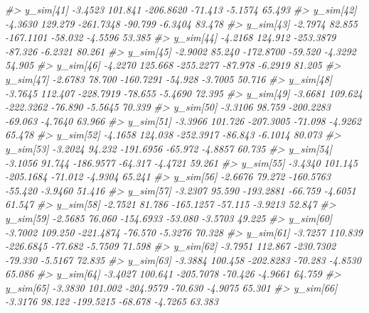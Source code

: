 \documentclass[
  10pt,
  italian,
  a4paper,
  extrafontsizes,onecolumn,openright
  ]{memoir}
\newenvironment{Shaded}{\begin{snugshade}}{\end{snugshade}}
\newcommand{\CommentTok}[1]{\textcolor[rgb]{0.56,0.35,0.01}{\textit{#1}}}
\begin{document}
\begin{Shaded}
\begin{Highlighting}[]
\CommentTok{\#\textgreater{}   y\_sim[41]  {-}3.4523 101.841 {-}206.8620 {-}71.413 {-}5.1574 65.493}
\CommentTok{\#\textgreater{}   y\_sim[42]  {-}4.3630 129.279 {-}261.7348 {-}90.799 {-}6.3404 83.478}
\CommentTok{\#\textgreater{}   y\_sim[43]  {-}2.7974  82.855 {-}167.1101 {-}58.032 {-}4.5596 53.385}
\CommentTok{\#\textgreater{}   y\_sim[44]  {-}4.2168 124.912 {-}253.3879 {-}87.326 {-}6.2321 80.261}
\CommentTok{\#\textgreater{}   y\_sim[45]  {-}2.9002  85.240 {-}172.8700 {-}59.520 {-}4.3292 54.905}
\CommentTok{\#\textgreater{}   y\_sim[46]  {-}4.2270 125.668 {-}255.2277 {-}87.978 {-}6.2919 81.205}
\CommentTok{\#\textgreater{}   y\_sim[47]  {-}2.6783  78.700 {-}160.7291 {-}54.928 {-}3.7005 50.716}
\CommentTok{\#\textgreater{}   y\_sim[48]  {-}3.7645 112.407 {-}228.7919 {-}78.655 {-}5.4690 72.395}
\CommentTok{\#\textgreater{}   y\_sim[49]  {-}3.6681 109.624 {-}222.3262 {-}76.890 {-}5.5645 70.339}
\CommentTok{\#\textgreater{}   y\_sim[50]  {-}3.3106  98.759 {-}200.2283 {-}69.063 {-}4.7640 63.966}
\CommentTok{\#\textgreater{}   y\_sim[51]  {-}3.3966 101.726 {-}207.3005 {-}71.098 {-}4.9262 65.478}
\CommentTok{\#\textgreater{}   y\_sim[52]  {-}4.1658 124.038 {-}252.3917 {-}86.843 {-}6.1014 80.073}
\CommentTok{\#\textgreater{}   y\_sim[53]  {-}3.2024  94.232 {-}191.6956 {-}65.972 {-}4.8857 60.735}
\CommentTok{\#\textgreater{}   y\_sim[54]  {-}3.1056  91.744 {-}186.9577 {-}64.317 {-}4.4721 59.261}
\CommentTok{\#\textgreater{}   y\_sim[55]  {-}3.4340 101.145 {-}205.1684 {-}71.012 {-}4.9304 65.241}
\CommentTok{\#\textgreater{}   y\_sim[56]  {-}2.6676  79.272 {-}160.5763 {-}55.420 {-}3.9460 51.416}
\CommentTok{\#\textgreater{}   y\_sim[57]  {-}3.2307  95.590 {-}193.2881 {-}66.759 {-}4.6051 61.547}
\CommentTok{\#\textgreater{}   y\_sim[58]  {-}2.7521  81.786 {-}165.1257 {-}57.115 {-}3.9213 52.847}
\CommentTok{\#\textgreater{}   y\_sim[59]  {-}2.5685  76.060 {-}154.6933 {-}53.080 {-}3.5703 49.225}
\CommentTok{\#\textgreater{}   y\_sim[60]  {-}3.7002 109.250 {-}221.4874 {-}76.570 {-}5.3276 70.328}
\CommentTok{\#\textgreater{}   y\_sim[61]  {-}3.7257 110.839 {-}226.6845 {-}77.682 {-}5.7509 71.598}
\CommentTok{\#\textgreater{}   y\_sim[62]  {-}3.7951 112.867 {-}230.7302 {-}79.330 {-}5.5167 72.835}
\CommentTok{\#\textgreater{}   y\_sim[63]  {-}3.3884 100.458 {-}202.8283 {-}70.283 {-}4.8530 65.086}
\CommentTok{\#\textgreater{}   y\_sim[64]  {-}3.4027 100.641 {-}205.7078 {-}70.426 {-}4.9661 64.759}
\CommentTok{\#\textgreater{}   y\_sim[65]  {-}3.3830 101.002 {-}204.9579 {-}70.630 {-}4.9075 65.301}
\CommentTok{\#\textgreater{}   y\_sim[66]  {-}3.3176  98.122 {-}199.5215 {-}68.678 {-}4.7265 63.383}

\end{Highlighting}
\end{Shaded}
\end{document}
